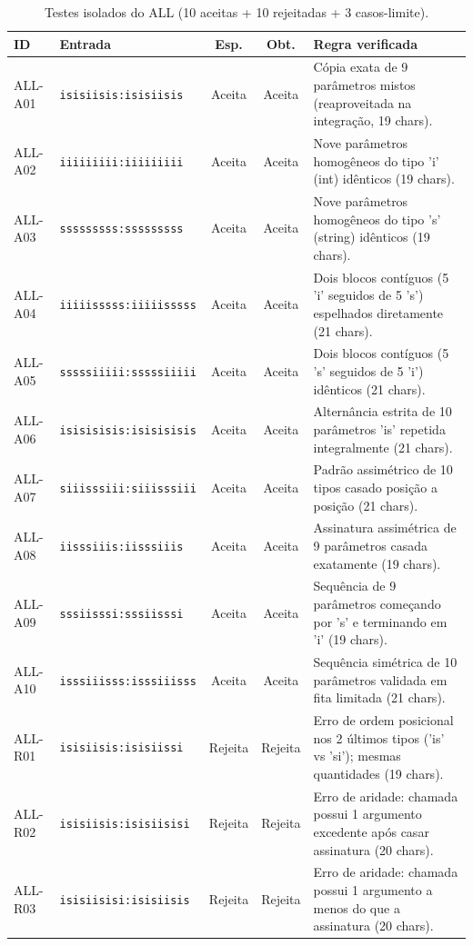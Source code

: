 \begin{table}[t]
\centering
\caption{Testes isolados do ALL (10 aceitas + 10 rejeitadas + 3 casos-limite).}
\label{tab:casos_all}
\scriptsize\setlength{\tabcolsep}{4pt}
\begin{tabularx}{\textwidth}{@{}llccX@{}}
\toprule
ID & Entrada & Esp. & Obt. & Regra verificada \\
\midrule
ALL-A01 & \texttt{isisiisis:isisiisis} & Aceita & Aceita & Cópia exata de 9 parâmetros mistos (reaproveitada na integração, 19 chars). \\
ALL-A02 & \texttt{iiiiiiiii:iiiiiiiii} & Aceita & Aceita & Nove parâmetros homogêneos do tipo 'i' (int) idênticos (19 chars). \\
ALL-A03 & \texttt{sssssssss:sssssssss} & Aceita & Aceita & Nove parâmetros homogêneos do tipo 's' (string) idênticos (19 chars). \\
ALL-A04 & \texttt{iiiiisssss:iiiiisssss} & Aceita & Aceita & Dois blocos contíguos (5 'i' seguidos de 5 's') espelhados diretamente (21 chars). \\
ALL-A05 & \texttt{sssssiiiii:sssssiiiii} & Aceita & Aceita & Dois blocos contíguos (5 's' seguidos de 5 'i') idênticos (21 chars). \\
ALL-A06 & \texttt{isisisisis:isisisisis} & Aceita & Aceita & Alternância estrita de 10 parâmetros 'is' repetida integralmente (21 chars). \\
ALL-A07 & \texttt{siiisssiii:siiisssiii} & Aceita & Aceita & Padrão assimétrico de 10 tipos casado posição a posição (21 chars). \\
ALL-A08 & \texttt{iisssiiis:iisssiiis} & Aceita & Aceita & Assinatura assimétrica de 9 parâmetros casada exatamente (19 chars). \\
ALL-A09 & \texttt{sssiisssi:sssiisssi} & Aceita & Aceita & Sequência de 9 parâmetros começando por 's' e terminando em 'i' (19 chars). \\
ALL-A10 & \texttt{isssiiisss:isssiiisss} & Aceita & Aceita & Sequência simétrica de 10 parâmetros validada em fita limitada (21 chars). \\
ALL-R01 & \texttt{isisiisis:isisiissi} & Rejeita & Rejeita & Erro de ordem posicional nos 2 últimos tipos ('is' vs 'si'); mesmas quantidades (19 chars). \\
ALL-R02 & \texttt{isisiisis:isisiisisi} & Rejeita & Rejeita & Erro de aridade: chamada possui 1 argumento excedente após casar assinatura (20 chars). \\
ALL-R03 & \texttt{isisiisisi:isisiisis} & Rejeita & Rejeita & Erro de aridade: chamada possui 1 argumento a menos do que a assinatura (20 chars). \\

\end{tabularx}
\end{table}
